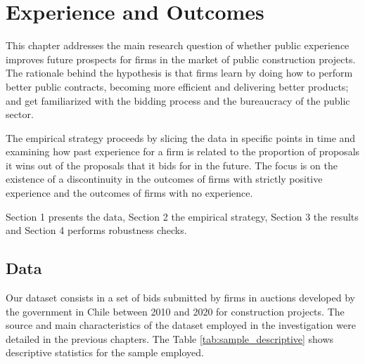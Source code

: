 \chapter{Experience and Outcomes
}
This chapter addresses the main research question of whether public experience improves future prospects for firms in the market of public construction projects.  The rationale behind the hypothesis is that firms learn by doing how to perform better public contracts, becoming more efficient and delivering better products; and get familiarized with the bidding process and the bureaucracy of the public sector.

The empirical strategy proceeds by slicing the data in specific points in time and examining how past experience for a firm is related to the proportion of proposals it wins out of the proposals that it bids for in the future. The focus is on the existence of a discontinuity in the outcomes of firms with strictly positive experience and the outcomes of firms with no experience.

Section 1 presents the data, Section 2 the empirical strategy, Section 3 the results and Section 4 performs robustness checks.

\section{Data}
\label{section:datamain}
Our dataset consists in a set of bids submitted by firms in auctions developed by the government in Chile between 2010 and 2020 for construction projects. The source and main characteristics of the dataset employed in the investigation were detailed in the previous chapters. The Table \ref{tab:sample_descriptive} shows descriptive statistics for the sample employed.


